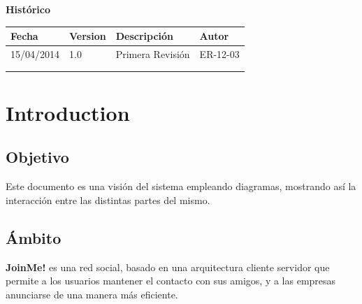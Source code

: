 \documentclass[12pt, a4paper, titlepage]{article}
\begin{document}
\begin{titlepage}
\vspace{2cm}

\begin{center}
	\large{\textbf{Histórico}}
	
    \begin{tabular}{ | p{4cm} | p{2cm} | p{6cm} | p{3cm} |}
    \hline
    \textbf{Fecha} & \textbf{Version} & \textbf{Descripción} & \textbf{Autor} \\ \hline
      15/04/2014 & 1.0 & Primera Revisión & ER-12-03\\ \hline
      &  &  & \\ \hline
     &  & &\\ \hline
    \end{tabular}
\end{center}

\end{titlepage}
\clearpage
\tableofcontents
\newpage

\section{Introduction}


\subsection{Objetivo}

Este documento es una visión del sistema empleando diagramas, mostrando así la interacción entre las distintas partes del mismo.

\subsection{Ámbito}

\textbf{JoinMe!} es una red social, basado en una arquitectura cliente servidor que permite a los usuarios mantener el contacto con sus amigos, y a las empresas anunciarse de una manera más eficiente. 
\end{document}
